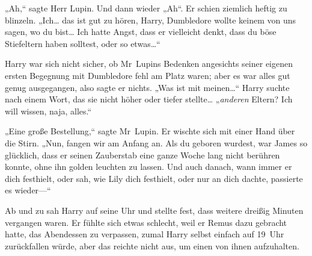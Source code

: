„Ah,“ sagte Herr Lupin. Und dann wieder „Ah“. Er schien ziemlich heftig zu blinzeln. „Ich… das ist gut zu hören, Harry, Dumbledore wollte keinem von uns sagen, wo du bist… Ich hatte Angst, dass er vielleicht denkt, dass du böse Stiefeltern haben solltest, oder so etwas…“

Harry war sich nicht sicher, ob Mr~Lupins Bedenken angesichts seiner eigenen ersten Begegnung mit Dumbledore fehl am Platz waren; aber es war alles gut genug ausgegangen, also sagte er nichts. „Was ist mit meinen…“ Harry suchte nach einem Wort, das sie nicht höher oder tiefer stellte… „\emph{anderen} Eltern? Ich will wissen, naja, alles.“

„Eine große Bestellung,“ sagte Mr~Lupin. Er wischte sich mit einer Hand über die Stirn. „Nun, fangen wir am Anfang an. Als du geboren wurdest, war James so glücklich, dass er seinen Zauberstab eine ganze Woche lang nicht berühren konnte, ohne ihn golden leuchten zu lassen. Und auch danach, wann immer er dich festhielt, oder sah, wie Lily dich festhielt, oder nur an dich dachte, passierte es wieder—“

\later

Ab und zu sah Harry auf seine Uhr und stellte fest, dass weitere dreißig Minuten vergangen waren. Er fühlte sich etwas schlecht, weil er Remus dazu gebracht hatte, das Abendessen zu verpassen, zumal Harry selbst einfach auf 19~Uhr zurückfallen würde, aber das reichte nicht aus, um einen von ihnen aufzuhalten.

